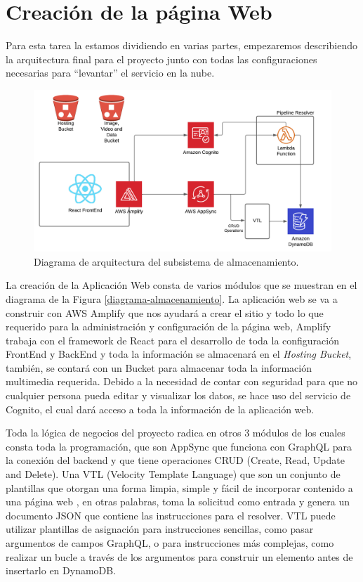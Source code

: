 \section{Creación de la página Web}
Para esta tarea la estamos dividiendo en varias partes, empezaremos describiendo la arquitectura final para el proyecto junto con todas las configuraciones necesarias para “levantar” el servicio en la nube.
\begin{figure}[H]
	\centering
	
	\label{fig:arquesub}
	\includegraphics[width=1\linewidth]{imagenes/arque_sub}
	\caption{Diagrama de arquitectura del subsistema de almacenamiento.}
\end{figure}

\noindent La creación de la Aplicación Web consta de varios módulos que se muestran en el diagrama de la Figura \ref{diagrama-almacenamiento}. La aplicación web se va a construir con AWS Amplify que nos ayudará a crear el sitio y todo lo que requerido para la administración y configuración de la página web, Amplify trabaja con el framework de React para el desarrollo de toda la configuración FrontEnd y BackEnd y toda la información se almacenará en el \textit{Hosting Bucket}, también, se contará con un Bucket para almacenar toda la información multimedia requerida. Debido a la necesidad de contar con seguridad para que no cualquier persona pueda editar y visualizar los datos, se hace uso del servicio de Cognito, el cual dará acceso a toda la información de la aplicación web.

\noindent Toda la lógica de negocios del proyecto radica en otros 3 módulos de los cuales consta toda la programación, que son AppSync que funciona con GraphQL para la conexión del backend y que tiene operaciones CRUD (Create, Read, Update and Delete).
Una VTL (Velocity Template Language) que son un conjunto de plantillas que otorgan una forma limpia, simple y fácil de incorporar contenido a una página web \cite{apacheVTL}, en otras palabras, toma la solicitud como entrada y genera un documento JSON que contiene las instrucciones para el resolver. VTL puede utilizar plantillas de asignación para instrucciones sencillas, como pasar argumentos de campos GraphQL, o para instrucciones más complejas, como realizar un bucle a través de los argumentos para construir un elemento antes de insertarlo en DynamoDB.

